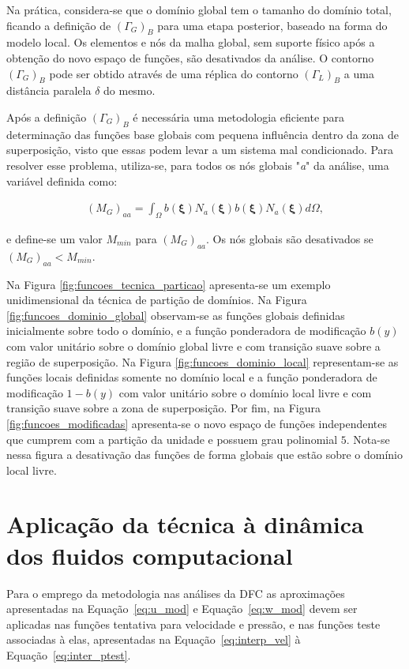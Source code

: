 Na prática, considera-se que o domínio global tem o tamanho do domínio total, ficando a definição de $(\Gamma_{G})_{B}$ para uma etapa posterior, baseado na forma do modelo local. Os elementos e nós da malha global, sem suporte físico após a obtenção do novo espaço de funções, são desativados da análise. O contorno $(\Gamma_{G})_{B}$ pode ser obtido através de uma réplica do contorno $(\Gamma_{L})_{B}$ a uma distância paralela $\delta$ do mesmo. 

Após a definição $(\Gamma_{G})_{B}$ é necessária uma metodologia eficiente para determinação das funções base globais com pequena influência dentro da zona de superposição, visto que essas podem levar a um sistema mal condicionado. Para resolver esse problema, utiliza-se, para todos os nós globais "\textit{a}" da análise, uma variável definida como:

\begin{align}
	(M_{G})_{aa} = \int_{\Omega}b(\bm{\xi})N_{a}(\bm{\xi})b(\bm{\xi})N_{a}(\bm{\xi})d\Omega, \label{eq:influence}
\end{align}

\noindent e define-se um valor $M_{min}$ para $(M_{G})_{aa}$. Os nós globais são desativados se $(M_{G})_{aa} < M_{min}$. 

Na Figura \ref{fig:funcoes_tecnica_particao} apresenta-se um exemplo unidimensional da técnica de partição de domínios. Na Figura \ref{fig:funcoes_dominio_global} observam-se as funções globais definidas inicialmente sobre todo o domínio, e a função ponderadora de modificação $b(y)$ com valor unitário sobre o domínio global livre e com transição suave sobre a região de superposição. Na Figura \ref{fig:funcoes_dominio_local} representam-se as funções locais definidas somente no domínio local e a função ponderadora de modificação $1-b(y)$ com valor unitário sobre o domínio local livre e com transição suave sobre a zona de superposição. Por fim, na Figura \ref{fig:funcoes_modificadas} apresenta-se o novo espaço de funções independentes que cumprem com a partição da unidade e possuem grau polinomial $5$. Nota-se nessa figura a desativação das funções de forma globais que estão sobre o domínio local livre.

\section{Aplicação da técnica à dinâmica dos fluidos computacional}

Para o emprego da metodologia nas análises da DFC as aproximações apresentadas na Equação~\eqref{eq:u_mod} e Equação~\eqref{eq:w_mod} devem ser aplicadas nas funções tentativa para velocidade e pressão, e nas funções teste associadas à elas, apresentadas na Equação~\eqref{eq:interp_vel} à Equação~\eqref{eq:inter_ptest}.

